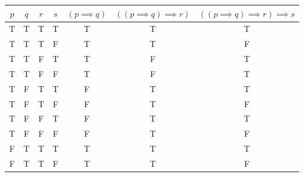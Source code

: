 \documentclass{article}
\begin{document}
\begin{tabular}{ | c | c | c | c | c | c | c | }
	$ p $ & $ q $ & $ r $ & $ s $ & $ \left( p \implies q \right) $ & $ \left( \left( p \implies q \right) \implies r \right) $ & $ \left( \left( p \implies q \right) \implies r \right) \implies s $ \\
	\hline
	T     & T     & T     & T     & T                               & T                                                         & T                                                                    \\
	T     & T     & T     & F     & T                               & T                                                         & F                                                                    \\
	T     & T     & F     & T     & T                               & F                                                         & T                                                                    \\
	T     & T     & F     & F     & T                               & F                                                         & T                                                                    \\
	T     & F     & T     & T     & F                               & T                                                         & T                                                                    \\
	T     & F     & T     & F     & F                               & T                                                         & F                                                                    \\
	T     & F     & F     & T     & F                               & T                                                         & T                                                                    \\
	T     & F     & F     & F     & F                               & T                                                         & F                                                                    \\
	F     & T     & T     & T     & T                               & T                                                         & T                                                                    \\
	F     & T     & T     & F     & T                               & T                                                         & F                                                                    \\

\end{tabular}
\end{document}
